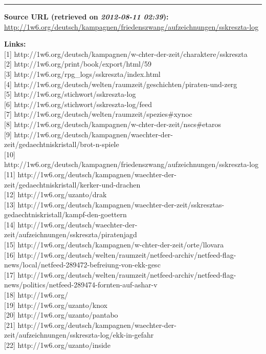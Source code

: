 \documentclass[11pt]{article}
\begin{document}
\begin{center}\rule{3in}{0.4pt}\end{center}

\textbf{Source URL (retrieved on \emph{2012-08-11 02:39}):}
\href{http://1w6.org/deutsch/kampagnen/friedenszwang/aufzeichnungen/sskreszta-log}{http://1w6.org/deutsch/kampagnen/friedenszwang/aufzeichnungen/sskreszta-log}

\textbf{Links:}\\{[}1{]}
http://1w6.org/deutsch/kampagnen/w-chter-der-zeit/charaktere/sskreszta\\
{[}2{]} http://1w6.org/print/book/export/html/59\\ {[}3{]}
http://1w6.org/rpg\_logs/sskreszta/index.html\\ {[}4{]}
http://1w6.org/deutsch/welten/raumzeit/geschichten/piraten-und-zerg\\
{[}5{]} http://1w6.org/stichwort/sskreszta-log\\ {[}6{]}
http://1w6.org/stichwort/sskreszta-log/feed\\ {[}7{]}
http://1w6.org/deutsch/welten/raumzeit/spezies\#xynoc\\ {[}8{]}
http://1w6.org/deutsch/kampagnen/w-chter-der-zeit/nscs\#etaros\\ {[}9{]}
http://1w6.org/deutsch/kampagnen/waechter-der-zeit/gedaechtniskristall/brot-n-spiele\\
{[}10{]}
http://1w6.org/deutsch/kampagnen/friedenszwang/aufzeichnungen/sskreszta-log\\
{[}11{]}
http://1w6.org/deutsch/kampagnen/waechter-der-zeit/gedaechtniskristall/kerker-und-drachen\\
{[}12{]} http://1w6.org/uzanto/drak\\ {[}13{]}
http://1w6.org/deutsch/kampagnen/waechter-der-zeit/sskresztas-gedaechtniskristall/kampf-den-goettern\\
{[}14{]}
http://1w6.org/deutsch/waechter-der-zeit/aufzeichnungen/sskreszta/piratenjagd\\
{[}15{]}
http://1w6.org/deutsch/kampagnen/w-chter-der-zeit/orte/llovara\\
{[}16{]}
http://1w6.org/deutsch/welten/raumzeit/netfeed-archiv/netfeed-flag-news/local/netfeed-289472-befreiung-von-ekk-gesc\\
{[}17{]}
http://1w6.org/deutsch/welten/raumzeit/netfeed-archiv/netfeed-flag-news/politics/netfeed-289474-fornten-auf-ashar-v\\
{[}18{]} http://1w6.org/\\ {[}19{]} http://1w6.org/uzanto/knox\\
{[}20{]} http://1w6.org/uzanto/pantabo\\ {[}21{]}
http://1w6.org/deutsch/kampagnen/waechter-der-zeit/aufzeichnungen/sskreszta-log/ekk-in-gefahr\\
{[}22{]} http://1w6.org/uzanto/inside\\
\end{document}
